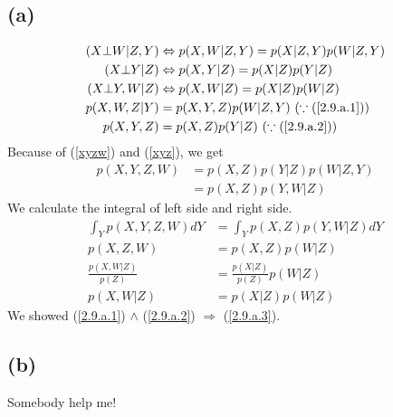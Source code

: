 \documentclass{jsarticle}
\begin{document}
\subsection*{(a)}
\begin{align}
(X \bot W|Z,Y) & \Leftrightarrow p(X,W|Z,Y) = p(X|Z,Y)p(W|Z,Y) \label{2.9.a.1} \\
(X \bot Y|Z) & \Leftrightarrow p(X,Y|Z) = p(X|Z)p(Y|Z) \label{2.9.a.2} \\
(X\bot Y,W|Z) & \Leftrightarrow p(X,W|Z) = p(X|Z)p(W|Z) \label{2.9.a.3} \\
p(X,W,Z|Y) & = p(X,Y,Z)p(W|Z,Y)\ (\because (\ref{2.9.a.1})) \label{xyzw}\\
p(X,Y,Z) & = p(X,Z)p(Y|Z)\ (\because (\ref{2.9.a.2})) \label{xyz}
\end{align}
Because of (\ref{xyzw}) and (\ref{xyz}), we get
\begin{align}
p(X,Y,Z,W) & = p(X,Z)p(Y|Z)p(W|Z,Y)\\
& = p(X,Z)p(Y,W|Z)
\end{align}
We calculate the integral of left side and right side.
\begin{align}
\int_{Y}p(X,Y,Z,W)dY & = \int_{Y}p(X,Z)p(Y,W|Z)dY\\
p(X,Z,W) & = p(X,Z)p(W|Z)\\
\frac{p(X,W|Z)}{p(Z)} & = \frac{p(X|Z)}{p(Z)}p(W|Z)\\
p(X,W|Z) & = p(X|Z)p(W|Z)
\end{align}
We showed (\ref{2.9.a.1}) $\wedge$ (\ref{2.9.a.2}) $\Rightarrow$ (\ref{2.9.a.3}).
\subsection*{(b)}
Somebody help me!
\end{document}

